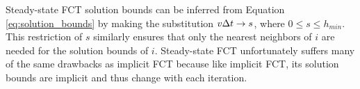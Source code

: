 Steady-state FCT solution bounds can be inferred from Equation \eqref{eq:solution_bounds}
by making the substitution $v\Delta t\rightarrow s$, where $0\leq s \leq h_{min}$. This
restriction of $s$ similarly ensures that only the nearest neighbors of $i$ are
needed for the solution bounds of $i$. Steady-state FCT unfortunately suffers
many of the same drawbacks as implicit FCT because like implicit FCT, its
solution bounds are implicit and thus change with each iteration.
%
%
